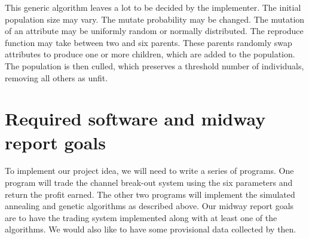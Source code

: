 \documentclass[10pt]{article}
\begin{document}
This generic algorithm leaves a lot to be decided by the implementer.
The initial population size may vary.  The mutate probability may be changed.
The mutation of an attribute may be uniformly random or normally distributed.
The reproduce function may take between two and six parents.  These parents
randomly swap attributes to produce one or more children, which are added to the
population.  The population is then culled, which preserves a threshold
number of individuals, removing all others as unfit.

\section{Required software and midway report goals}
To implement our project idea, we will need to write a series of programs.  One
program will trade the channel break-out system using the six parameters and
return the profit earned.  The other two programs will implement the simulated
annealing and genetic algorithms as described above.  Our midway report goals
are to have the trading system implemented along with at least one of the
algorithms.  We would also like to have some provisional data collected by then.



\nocite{*}
\end{document}
